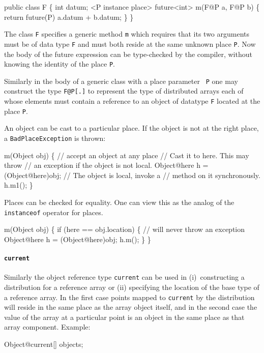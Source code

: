 \begin{x10}
public class F \{
  int datum;
  <P instance place> future<int> m(F@P a, F@P b) \{
    return future(P) {a.datum + b.datum;}
  \}
\}
\end{x10}
The class {\tt F} specifies a generic method {\tt m} which requires that 
its two arguments must be of data type {\tt F} and must both reside
at the same unknown place {\tt P}. Now the body of the {\cf future} expression
can be type-checked by the compiler, without knowing the identity 
of the place {\tt P}.

Similarly in the body of a generic class with a place parameter {\tt
P} one may construct the type {\tt F@P[.]} to represent the type of
distributed arrays each of whose elements must contain a reference to
an object of datatype {\tt F} located at the place {\tt P}.


An object can be cast to a particular place. If the object is not at
the right place, a {\tt BadPlaceException} is thrown:

\begin{x10}
m(Object obj) \{ // accept an object at any place
     // Cast it to here. This may throw
     // an exception if the object is not local.
     Object@here h = (Object@here)obj;
     // The object is local, invoke a
     // method on it synchronously.
     h.m1();
 \}
\end{x10}

Places can be checked for equality. One can view this as the analog of
the {\tt instanceof} operator for places.

\begin{x10}
m(Object obj) \{
    if (here == obj.location) \{
       // will never throw an exception
      Object@here h = (Object@here)obj;
      h.m();
   \}
\}
\end{x10}


\paragraph{{\tt current}}
Similarly the object reference type {\tt current} can be used in
(i)~constructing a distribution for a reference array or (ii)
specifying the location of the base type of a reference array. In the
first case points mapped to {\tt current} by the distribution will
reside in the same place as the array object itself, and in the second
case the value of the array at a particular point is an object in the
same place as that array component. Example:
\begin{x10}
    Object@current[] objects;
\end{x10}



